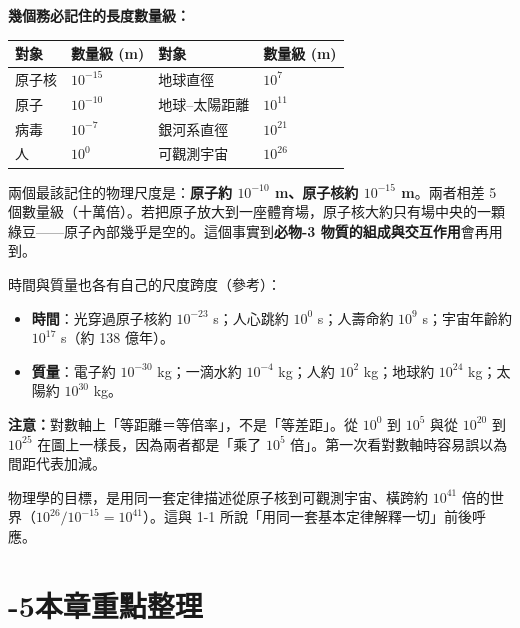 \documentclass[11pt]{article}
\begin{document}

\textbf{幾個務必記住的長度數量級：}
\begin{center}
\renewcommand{\arraystretch}{1.2}
\begin{tabular}{l l @{\hskip 2.5em} l l}
\hline
對象 & 數量級 (m) & 對象 & 數量級 (m) \\
\hline
原子核 & $10^{-15}$ & 地球直徑 & $10^{7}$ \\
原子 & $10^{-10}$ & 地球–太陽距離 & $10^{11}$ \\
病毒 & $10^{-7}$ & 銀河系直徑 & $10^{21}$ \\
人 & $10^{0}$ & 可觀測宇宙 & $10^{26}$ \\
\hline
\end{tabular}
\end{center}

兩個最該記住的物理尺度是：\textbf{原子約 $10^{-10}$ m、原子核約 $10^{-15}$ m}。兩者相差 5 個數量級（十萬倍）。若把原子放大到一座體育場，原子核大約只有場中央的一顆綠豆——原子內部幾乎是空的。這個事實到\textbf{必物-3 物質的組成與交互作用}會再用到。

時間與質量也各有自己的尺度跨度（參考）：
\begin{itemize}\setlength{\itemsep}{1pt}
\item \textbf{時間}：光穿過原子核約 $10^{-23}$ s；人心跳約 $10^{0}$ s；人壽命約 $10^{9}$ s；宇宙年齡約 $10^{17}$ s（約 138 億年）。
\item \textbf{質量}：電子約 $10^{-30}$ kg；一滴水約 $10^{-4}$ kg；人約 $10^{2}$ kg；地球約 $10^{24}$ kg；太陽約 $10^{30}$ kg。
\end{itemize}

\textbf{注意：}對數軸上「等距離＝等倍率」，不是「等差距」。從 $10^{0}$ 到 $10^{5}$ 與從 $10^{20}$ 到 $10^{25}$ 在圖上一樣長，因為兩者都是「乘了 $10^5$ 倍」。第一次看對數軸時容易誤以為間距代表加減。

物理學的目標，是用同一套定律描述從原子核到可觀測宇宙、橫跨約 $10^{41}$ 倍的世界（$10^{26}/10^{-15}=10^{41}$）。這與 1-1 所說「用同一套基本定律解釋一切」前後呼應。

\section*{-5\quad 本章重點整理}
\end{document}
